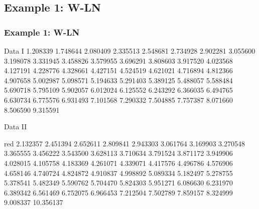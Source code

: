 \subsection{Example 1: W-LN}
\begin{frame}
  \frametitle{Example 1: W-LN}

\begin{footnotesize}
\begin{block}{Data I}
1.208339 1.748644 2.080409 2.335513 2.548681 2.734928 2.902281
3.055600 3.198078 3.331945 3.458826 3.579955 3.696291 3.808603
3.917520 4.023568 4.127191 4.228776 4.328661 4.427151 4.524519
4.621021 4.716894 4.812366 4.907658 5.002987 5.098571 5.194633
5.291403 5.389125 5.488057 5.588484 5.690718 5.795109 5.902057
6.012024 6.125552 6.243292 6.366035 6.494765 6.630734 6.775576
6.931493 7.101568 7.290332 7.504885 7.757387 8.071660 8.506590
9.315591
\end{block}

\begin{block}{Data II}
\begin{color}{red}
2.132357  2.451394  2.652611  2.809841  2.943303  3.061764  3.169903
 3.270548  3.365555  3.456222  3.543500  3.628113  3.710634  3.791524
 3.871172  3.949906  4.028015  4.105758  4.183369  4.261071  4.339071
 4.417576  4.496786  4.576906  4.658146  4.740724  4.824872  4.910837
 4.998892  5.089334  5.182497  5.278755  5.378541  5.482349  5.590762
 5.704470  5.824303  5.951271  6.086630  6.231970  6.389342  6.561469
 6.752075  6.966453  7.212504  7.502789  7.859157  8.324999  9.008337
10.356137
\end{color}
\end{block}
\end{footnotesize}
\end{frame}

